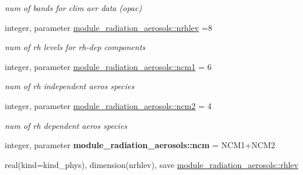\begin{DoxyCompactItemize}
\begin{DoxyCompactList}\small\item\em num of bands for clim aer data (opac) \end{DoxyCompactList}\item 
\mbox{\label{group__module__radiation__aerosols_gaa6d18b0588e80cb40871cc75870d09ba}} 
integer, parameter \hyperlink{group__module__radiation__aerosols_gaa6d18b0588e80cb40871cc75870d09ba}{module\+\_\+radiation\+\_\+aerosols\+::nrhlev} =8
\begin{DoxyCompactList}\small\item\em num of rh levels for rh-\/dep components \end{DoxyCompactList}\item 
\mbox{\label{group__module__radiation__aerosols_gac6bc533a79d4b19129834cbc9a9fbc18}} 
integer, parameter \hyperlink{group__module__radiation__aerosols_gac6bc533a79d4b19129834cbc9a9fbc18}{module\+\_\+radiation\+\_\+aerosols\+::ncm1} = 6
\begin{DoxyCompactList}\small\item\em num of rh independent aeros species \end{DoxyCompactList}\item 
\mbox{\label{group__module__radiation__aerosols_ga61dbcce5b0bb02dd31d4a37983887a7b}} 
integer, parameter \hyperlink{group__module__radiation__aerosols_ga61dbcce5b0bb02dd31d4a37983887a7b}{module\+\_\+radiation\+\_\+aerosols\+::ncm2} = 4
\begin{DoxyCompactList}\small\item\em num of rh dependent aeros species \end{DoxyCompactList}\item 
\mbox{\label{group__module__radiation__aerosols_gab46e61a4a386794a5e9e97d8ef7d98a5}} 
integer, parameter {\bfseries module\+\_\+radiation\+\_\+aerosols\+::ncm} = N\+C\+M1+N\+C\+M2
\item 
\mbox{\label{group__module__radiation__aerosols_ga6aa3218393ea05cab77ab7867cfeab90}} 
real(kind=kind\+\_\+phys), dimension(nrhlev), save \hyperlink{group__module__radiation__aerosols_ga6aa3218393ea05cab77ab7867cfeab90}{module\+\_\+radiation\+\_\+aerosols\+::rhlev}

\end{DoxyCompactItemize}
